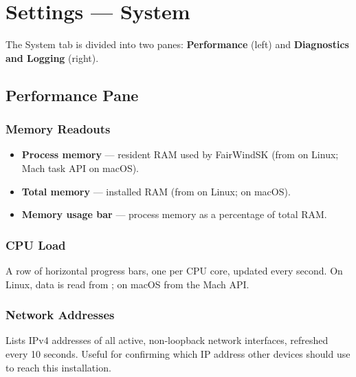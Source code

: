 \chapter{Settings --- System}
\label{ch:settings-system}

The System tab is divided into two panes: \textbf{Performance} (left) and
\textbf{Diagnostics and Logging} (right).


\section{Performance Pane}

\subsection{Memory Readouts}

\begin{itemize}
  \item \textbf{Process memory} --- resident RAM used by FairWindSK
        (from  on Linux; Mach task API on macOS).
  \item \textbf{Total memory} --- installed RAM
        (from  on Linux;  on macOS).
  \item \textbf{Memory usage bar} --- process memory as a percentage of total RAM.
\end{itemize}

\subsection{CPU Load}

A row of horizontal progress bars, one per CPU core, updated every second.
On Linux, data is read from ;
on macOS from the Mach  API.

\subsection{Network Addresses}

Lists IPv4 addresses of all active, non-loopback network interfaces, refreshed every 10 seconds.
Useful for confirming which IP address other devices should use to reach this installation.

